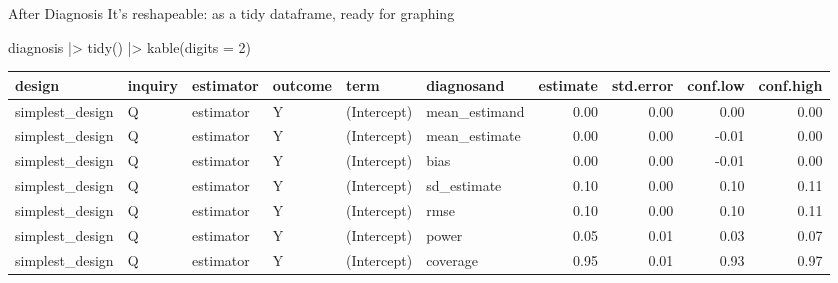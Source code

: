 \documentclass[
  11pt,
  ignorenonframetext,
]{beamer}
\newenvironment{Shaded}{\begin{snugshade}}{\end{snugshade}}
\newcommand{\AttributeTok}[1]{\textcolor[rgb]{0.40,0.45,0.13}{#1}}
\newcommand{\DecValTok}[1]{\textcolor[rgb]{0.68,0.00,0.00}{#1}}
\newcommand{\FunctionTok}[1]{\textcolor[rgb]{0.28,0.35,0.67}{#1}}
\newcommand{\NormalTok}[1]{\textcolor[rgb]{0.00,0.23,0.31}{#1}}
\newcommand{\SpecialCharTok}[1]{\textcolor[rgb]{0.37,0.37,0.37}{#1}}
\begin{document}
\begin{frame}[fragile]{After Diagnosis}
\protect\hypertarget{after-diagnosis}{}
It's reshapeable: as a tidy dataframe, ready for graphing

\begin{Shaded}
\begin{Highlighting}[]
\NormalTok{diagnosis }\SpecialCharTok{|\textgreater{}} 
  \FunctionTok{tidy}\NormalTok{() }\SpecialCharTok{|\textgreater{}} \FunctionTok{kable}\NormalTok{(}\AttributeTok{digits =} \DecValTok{2}\NormalTok{)}
\end{Highlighting}
\end{Shaded}

\begin{tabular}{l|l|l|l|l|l|r|r|r|r}
\hline
design & inquiry & estimator & outcome & term & diagnosand & estimate & std.error & conf.low & conf.high\\
\hline
simplest\_design & Q & estimator & Y & (Intercept) & mean\_estimand & 0.00 & 0.00 & 0.00 & 0.00\\
\hline
simplest\_design & Q & estimator & Y & (Intercept) & mean\_estimate & 0.00 & 0.00 & -0.01 & 0.00\\
\hline
simplest\_design & Q & estimator & Y & (Intercept) & bias & 0.00 & 0.00 & -0.01 & 0.00\\
\hline
simplest\_design & Q & estimator & Y & (Intercept) & sd\_estimate & 0.10 & 0.00 & 0.10 & 0.11\\
\hline
simplest\_design & Q & estimator & Y & (Intercept) & rmse & 0.10 & 0.00 & 0.10 & 0.11\\
\hline
simplest\_design & Q & estimator & Y & (Intercept) & power & 0.05 & 0.01 & 0.03 & 0.07\\
\hline
simplest\_design & Q & estimator & Y & (Intercept) & coverage & 0.95 & 0.01 & 0.93 & 0.97\\
\hline
\end{tabular}
\end{frame}
\end{document}
